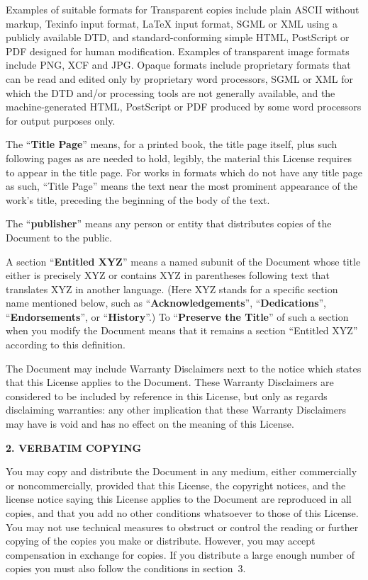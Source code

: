 \documentclass[a4paper,11pt,oneside]{book}
\begin{document}
Examples of suitable formats for Transparent copies include plain
ASCII without markup, Texinfo input format, LaTeX input format, SGML
or XML using a publicly available DTD, and standard-conforming simple
HTML, PostScript or PDF designed for human modification.  Examples of
transparent image formats include PNG, XCF and JPG.  Opaque formats
include proprietary formats that can be read and edited only by
proprietary word processors, SGML or XML for which the DTD and/or
processing tools are not generally available, and the
machine-generated HTML, PostScript or PDF produced by some word
processors for output purposes only.

The ``\textbf{Title Page}'' means, for a printed book, the title page itself,
plus such following pages as are needed to hold, legibly, the material
this License requires to appear in the title page.  For works in
formats which do not have any title page as such, ``Title Page'' means
the text near the most prominent appearance of the work's title,
preceding the beginning of the body of the text.

The ``\textbf{publisher}'' means any person or entity that distributes
copies of the Document to the public.

A section ``\textbf{Entitled XYZ}'' means a named subunit of the Document whose
title either is precisely XYZ or contains XYZ in parentheses following
text that translates XYZ in another language.  (Here XYZ stands for a
specific section name mentioned below, such as ``\textbf{Acknowledgements}'',
``\textbf{Dedications}'', ``\textbf{Endorsements}'', or ``\textbf{History}''.)
To ``\textbf{Preserve the Title}''
of such a section when you modify the Document means that it remains a
section ``Entitled XYZ'' according to this definition.

The Document may include Warranty Disclaimers next to the notice which
states that this License applies to the Document.  These Warranty
Disclaimers are considered to be included by reference in this
License, but only as regards disclaiming warranties: any other
implication that these Warranty Disclaimers may have is void and has
no effect on the meaning of this License.


\begin{center}
	{\Large\bf 2. VERBATIM COPYING\par}
\end{center}

You may copy and distribute the Document in any medium, either
commercially or noncommercially, provided that this License, the
copyright notices, and the license notice saying this License applies
to the Document are reproduced in all copies, and that you add no other
conditions whatsoever to those of this License.  You may not use
technical measures to obstruct or control the reading or further
copying of the copies you make or distribute.  However, you may accept
compensation in exchange for copies.  If you distribute a large enough
number of copies you must also follow the conditions in section~3.
\end{document}
